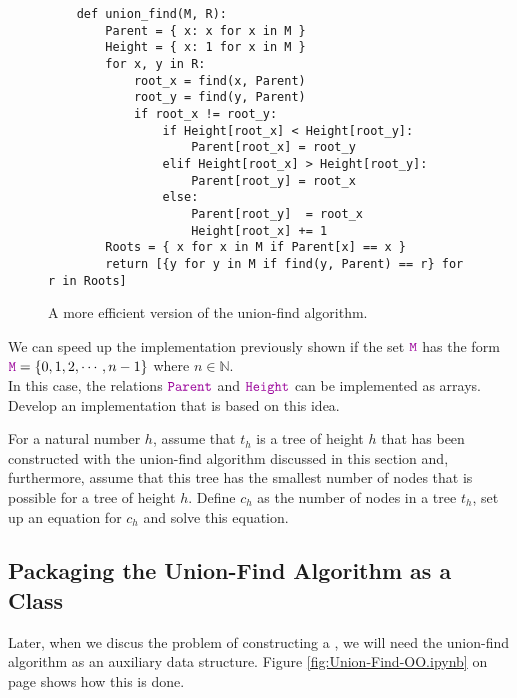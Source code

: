 \begin{figure}[!ht]
\centering
\begin{verbatim}
    def union_find(M, R):
        Parent = { x: x for x in M } 
        Height = { x: 1 for x in M }
        for x, y in R:
            root_x = find(x, Parent)
            root_y = find(y, Parent)
            if root_x != root_y:
                if Height[root_x] < Height[root_y]:
                    Parent[root_x] = root_y
                elif Height[root_x] > Height[root_y]:
                    Parent[root_y] = root_x
                else:
                    Parent[root_y]  = root_x
                    Height[root_x] += 1
        Roots = { x for x in M if Parent[x] == x }
        return [{y for y in M if find(y, Parent) == r} for r in Roots]
\end{verbatim}
\vspace*{-0.3cm}
\caption{A more efficient version of the union-find algorithm.}
\label{fig:Union-Find.ipynb}
\end{figure}

\exercise
We can speed up the implementation previously shown if the set $\mytt{M}$ has the form
\\[0.2cm]
\hspace*{1.3cm}
$\mytt{M} = \{ 0, 1, 2, \cdots, n-1 \}$ \quad where $n \in \mathbb{N}$.
\\[0.2cm]
In this case, the relations $\mytt{Parent}$ and $\mytt{Height}$ can be implemented as arrays.
Develop an implementation that is based on this idea.
\eox

\exercise
For a natural number $h$, assume that $t_h$ is a tree of height $h$ that has been constructed with the union-find algorithm
discussed in this section and, furthermore, assume that this tree has the smallest number of nodes that is
possible for a tree of height $h$.  Define $c_h$ as the number of nodes in a tree $t_h$, set up an equation for
$c_h$ and solve this equation. \eox


\subsection{Packaging the  Union-Find Algorithm as a Class \label{sec:union-find-oo}}
Later, when we discus the problem of constructing a , we will need the union-find
algorithm as an auxiliary data structure.  Figure \ref{fig:Union-Find-OO.ipynb} on page
\pageref{fig:Union-Find-OO.ipynb} shows how this is done.

